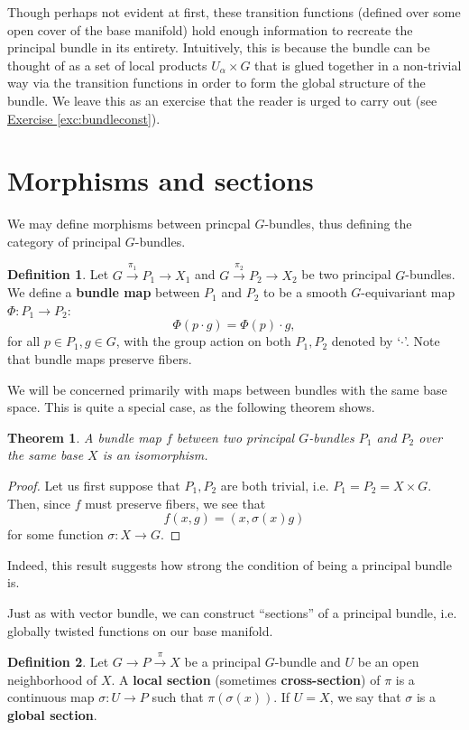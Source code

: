 \documentclass{book}
\theoremstyle{plain}
\newtheorem{thm}{Theorem}
\theoremstyle{definition}
\newtheorem{defn}{Definition}
\theoremstyle{remark}
\begin{document}
Though perhaps not evident at first, these transition functions (defined over some open cover of the base manifold) hold enough
information to recreate the principal bundle in its entirety. Intuitively, this is because the bundle can be thought of
as a set of local products $U_\alpha\times G$ that is glued together in a non-trivial way via the transition functions in order to
form the global structure of the bundle. We leave this as an exercise that the reader is urged to carry out (see \hyperref[exc:bundleconst]{Exercise \ref*{exc:bundleconst}}).

\section{Morphisms and sections}

We may define morphisms between princpal $G$-bundles, thus defining the category of principal $G$-bundles.
\begin{defn}
    Let $G\overset{\pi_1}{\to}P_1\to X_1$ and $G\overset{\pi_2}{\to}P_2\to X_2$ be two principal $G$-bundles. We define a \textbf{bundle
    map} between $P_1$ and $P_2$ to be a smooth $G$-equivariant map $\Phi:P_1\to P_2$:
    \[\Phi(p\cdot g)=\Phi(p)\cdot g,\]
    for all $p\in P_1, g\in G$, with the group action on both $P_1,P_2$ denoted by `$\cdot$'. Note that bundle maps preserve fibers.
\end{defn}

We will be concerned primarily with maps between bundles with the same base space. This is quite a special case, as the following theorem shows.
\begin{thm}
    A bundle map $f$ between two principal $G$-bundles $P_1$ and $P_2$ over the same base $X$ is an isomorphism.
\end{thm}
\begin{proof}
    Let us first suppose that $P_1,P_2$ are both trivial, i.e. $P_1=P_2=X\times G$. Then, since $f$ must preserve fibers, we see that
    \[f(x,g)=(x,\sigma(x)g)\]
    for some function $\sigma:X\to G$.
\end{proof}
Indeed, this result suggests how strong the condition of being a principal bundle is.



Just as with vector bundle, we can construct ``sections'' of a principal bundle, i.e. globally twisted functions on our base manifold.

\begin{defn}
    Let $G\to P\overset{\pi}{\to} X$ be a principal $G$-bundle and $U$ be an open neighborhood of $X$. A \textbf{local section} (sometimes \textbf{cross-section}) of $\pi$ is a continuous map $\sigma: U\to P$ such that $\pi(\sigma(x))$. If $U=X$, we say that $\sigma$ is a \textbf{global section}.
\end{defn}
\end{document}
